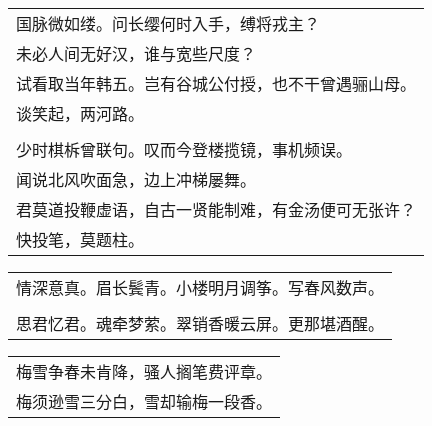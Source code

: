 \nopagebreak%
\nopagebreak%
\noindent\begin{minipage}{\linewidth}
  \vskip-3pt\begin{table}[H]
    \centering
    \begin{tabular}{@{}l@{}}
国脉微如缕。问长缨何时入手，缚将戎主？\\
未必人间无好汉，谁与宽些尺度？\\
试看取当年韩五。岂有谷城公付授，也不干曾遇骊山母。\\
谈笑起，两河路。\\
\\
少时棋柝曾联句。叹而今登楼揽镜，事机频误。\\
闻说北风吹面急，边上冲梯屡舞。\\
君莫道投鞭虚语，自古一贤能制难，有金汤便可无张许？\\
快投笔，莫题柱。
    \end{tabular}
  \end{table}
\end{minipage}
\vspace{1cm}


\nopagebreak%
\nopagebreak%
\noindent\begin{minipage}{\linewidth}
  \vskip-3pt\begin{table}[H]
    \centering
    \begin{tabular}{@{}l@{}}
情深意真。眉长鬓青。小楼明月调筝。写春风数声。\\
\\
思君忆君。魂牵梦萦。翠销香暖云屏。更那堪酒醒。
    \end{tabular}
  \end{table}
\end{minipage}
\vspace{1cm}


\nopagebreak%
\nopagebreak%
\noindent\begin{minipage}{\linewidth}
  \vskip-3pt\begin{table}[H]
    \centering
    \begin{tabular}{@{}l@{}}
梅雪争春未肯降，骚人搁笔费评章。\\
梅须逊雪三分白，雪却输梅一段香。
    \end{tabular}
  \end{table}
\end{minipage}
\vspace{1cm}


